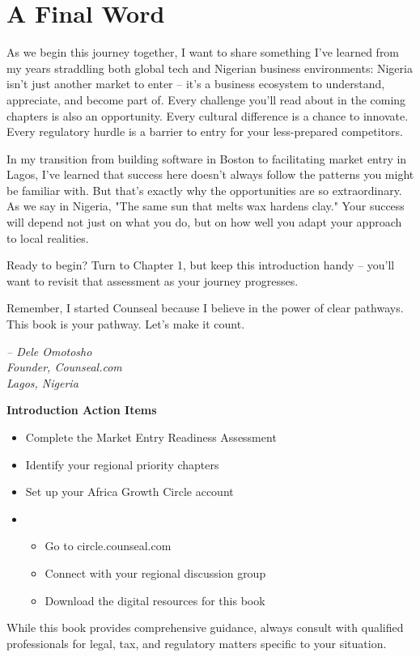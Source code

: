 \section{A Final Word}

As we begin this journey together, I want to share something I've learned from my years straddling both global tech and Nigerian business environments: Nigeria isn't just another market to enter – it's a business ecosystem to understand, appreciate, and become part of. Every challenge you'll read about in the coming chapters is also an opportunity. Every cultural difference is a chance to innovate. Every regulatory hurdle is a barrier to entry for your less-prepared competitors.

In my transition from building software in Boston to facilitating market entry in Lagos, I've learned that success here doesn't always follow the patterns you might be familiar with. But that's exactly why the opportunities are so extraordinary. As we say in Nigeria, "The same sun that melts wax hardens clay." Your success will depend not just on what you do, but on how well you adapt your approach to local realities.

Ready to begin? Turn to Chapter 1, but keep this introduction handy – you'll want to revisit that assessment as your journey progresses.

Remember, I started Counseal because I believe in the power of clear pathways. This book is your pathway. Let's make it count.

\begin{flushright}
\textit{-- Dele Omotosho\\
Founder, Counseal.com\\
Lagos, Nigeria}
\end{flushright}

\begin{workshopbox}
\textbf{Introduction Action Items}
\begin{itemize}
    \item Complete the Market Entry Readiness Assessment
    \item Identify your regional priority chapters
    \item Set up your Africa Growth Circle account
    \item \begin{itemize}
              \item Go to circle.counseal.com
              \item Connect with your regional discussion group
               \item Download the digital resources for this book
    \end{itemize}
\end{itemize}
\end{workshopbox}

\begin{warningbox}
While this book provides comprehensive guidance, always consult with qualified professionals for legal, tax, and regulatory matters specific to your situation.
\end{warningbox}
